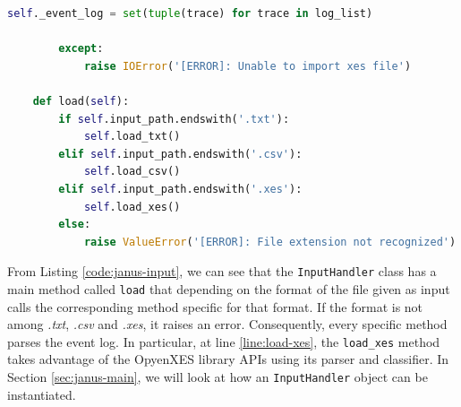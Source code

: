 \begin{lstlisting}[language=Python, style=Python, escapechar = £, label={code:janus-input}, caption={The \texttt{InputHandler.py} module}]
            self._event_log = set(tuple(trace) for trace in log_list)

        except:
            raise IOError('[ERROR]: Unable to import xes file')

    def load(self):
        if self.input_path.endswith('.txt'):
            self.load_txt()
        elif self.input_path.endswith('.csv'):
            self.load_csv()
        elif self.input_path.endswith('.xes'):
            self.load_xes()
        else:
            raise ValueError('[ERROR]: File extension not recognized')
\end{lstlisting}
From Listing \ref{code:janus-input}, we can see that the \texttt{InputHandler} class has a main method called \texttt{load} that depending on the format of the file given as input calls the corresponding method specific for that format. If the format is not among \textit{.txt}, \textit{.csv} and \textit{.xes}, it raises an error.
Consequently, every specific method parses the event log. In particular, at line \ref{line:load-xes}, the \texttt{load\_xes} method takes advantage of the OpyenXES library APIs using its parser and classifier. In Section \ref{sec:janus-main}, we will look at how an \texttt{InputHandler} object can be instantiated.
